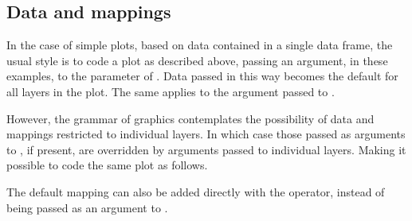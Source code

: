 \documentclass[krantz2]{krantz}\usepackage{knitr}%
\begin{document}
\subsection{Data and mappings}
In the case of simple plots, based on data contained in a single data frame, the usual style is to code a plot as described above, passing an argument,  in these examples, to the  parameter of . Data passed in this way becomes the default for all layers in the plot. The same applies to the argument passed to .

\begin{knitrout}\footnotesize
{}\color{fgcolor}\begin{kframe}
\begin{alltt}
\hlstd{(} 
        \hlstd{=} \hlstd{(}    \hlopt{+}
  \hlstd{()}
\end{alltt}
\end{kframe}
\end{knitrout}

However, the grammar of graphics contemplates the possibility of data and mappings restricted to individual layers. In which case those passed as arguments to , if present,  are overridden by arguments passed to individual layers. Making it possible to code the same plot as follows.

\begin{knitrout}\footnotesize
{}\color{fgcolor}\begin{kframe}
\begin{alltt}
\hlstd{()} \hlopt{+}
  \hlstd{(} 
              \hlstd{=} \hlstd{(}   
\end{alltt}
\end{kframe}
\end{knitrout}

The default mapping can also be added directly with the \code{+} operator, instead of being passed as an argument to .

\begin{knitrout}\footnotesize
{}\color{fgcolor}\begin{kframe}
\begin{alltt}
\hlstd{(}  \hlopt{+}
  \hlstd{(}    \hlopt{+}
  \hlstd{()}
\end{alltt}
\end{kframe}
\end{knitrout}
\end{document}
